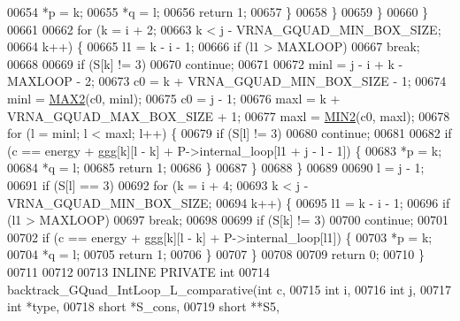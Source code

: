 \begin{DoxyCode}
00654           *p  = k;
00655           *q  = l;
00656           \textcolor{keywordflow}{return} 1;
00657         \}
00658       \}
00659     \}
00660   \}
00661 
00662   \textcolor{keywordflow}{for} (k = i + 2;
00663        k < j - VRNA\_GQUAD\_MIN\_BOX\_SIZE;
00664        k++) \{
00665     l1 = k - i - 1;
00666     \textcolor{keywordflow}{if} (l1 > MAXLOOP)
00667       \textcolor{keywordflow}{break};
00668 
00669     \textcolor{keywordflow}{if} (S[k] != 3)
00670       \textcolor{keywordflow}{continue};
00671 
00672     minl  = j - i + k - MAXLOOP - 2;
00673     c0    = k + VRNA\_GQUAD\_MIN\_BOX\_SIZE - 1;
00674     minl  = \hyperlink{group__utils_ga33297b3679c713b0c4d897cd0fe3b122}{MAX2}(c0, minl);
00675     c0    = j - 1;
00676     maxl  = k + VRNA\_GQUAD\_MAX\_BOX\_SIZE + 1;
00677     maxl  = \hyperlink{group__utils_gae0b9cd0ce090bd69b951aa73e8fa4f7d}{MIN2}(c0, maxl);
00678     \textcolor{keywordflow}{for} (l = minl; l < maxl; l++) \{
00679       \textcolor{keywordflow}{if} (S[l] != 3)
00680         \textcolor{keywordflow}{continue};
00681 
00682       \textcolor{keywordflow}{if} (c == energy + ggg[k][l - k] + P->internal\_loop[l1 + j - l - 1]) \{
00683         *p  = k;
00684         *q  = l;
00685         \textcolor{keywordflow}{return} 1;
00686       \}
00687     \}
00688   \}
00689 
00690   l = j - 1;
00691   \textcolor{keywordflow}{if} (S[l] == 3)
00692     \textcolor{keywordflow}{for} (k = i + 4;
00693          k < j - VRNA\_GQUAD\_MIN\_BOX\_SIZE;
00694          k++) \{
00695       l1 = k - i - 1;
00696       \textcolor{keywordflow}{if} (l1 > MAXLOOP)
00697         \textcolor{keywordflow}{break};
00698 
00699       \textcolor{keywordflow}{if} (S[k] != 3)
00700         \textcolor{keywordflow}{continue};
00701 
00702       \textcolor{keywordflow}{if} (c == energy + ggg[k][l - k] + P->internal\_loop[l1]) \{
00703         *p  = k;
00704         *q  = l;
00705         \textcolor{keywordflow}{return} 1;
00706       \}
00707     \}
00708 
00709   \textcolor{keywordflow}{return} 0;
00710 \}
00711 
00712 
00713 INLINE PRIVATE \textcolor{keywordtype}{int}
00714 backtrack\_GQuad\_IntLoop\_L\_comparative(\textcolor{keywordtype}{int}           c,
00715                                       \textcolor{keywordtype}{int}           i,
00716                                       \textcolor{keywordtype}{int}           j,
00717                                       \textcolor{keywordtype}{int}           *type,
00718                                       \textcolor{keywordtype}{short}         *S\_cons,
00719                                       \textcolor{keywordtype}{short}         **S5,

\end{DoxyCode}
